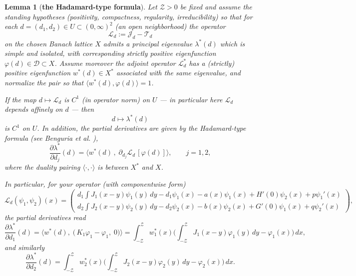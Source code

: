 \documentclass[a4paper,11pt]{amsart}
\newtheorem{lemma}[theorem]{Lemma}
\theoremstyle{definition}
\numberwithin{equation}{section}
\theoremstyle{definition}
\begin{document}
\begin{lemma}[\textbf{the Hadamard-type formula}]\label{lem:lambdaC1}
Let $\mathcal Z>0$ be fixed and assume the standing hypotheses (positivity, compactness, regularity, irreducibility) so that for each
$d=(d_1,d_2)\in U\subset(0,\infty)^2$ (an open neighborhood) the operator
\[
\mathcal L_d := \mathscr J_d - \mathscr T_d
\]
on the chosen Banach lattice \(X\) admits a principal eigenvalue \(\lambda^\ast(d)\) which is simple and isolated, with corresponding strictly positive eigenfunction
\(\varphi(d)\in\mathcal D\subset X\). Assume moreover the adjoint operator \(\mathcal L_d^*\) has a (strictly) positive eigenfunction \(w^*(d)\in X^*\) associated with the same eigenvalue, and normalize the pair so that \(\langle w^*(d),\varphi(d)\rangle =1\).

If the map \(d\mapsto\mathcal L_d\) is \(C^1\) (in operator norm) on \(U\) — in particular here \(\mathcal L_d\) depends affinely on \(d\) — then
\[
d \mapsto \lambda^\ast(d)
\]
is $C^1$ on \(U\). In addition, the partial derivatives are given by the Hadamard-type formula (see Benguria et al. \cite{Benguria2024}),
\[
\frac{\partial \lambda^\ast}{\partial d_j}(d)
= \big\langle w^*(d)\,,\; \partial_{d_j}\mathcal L_d\,[\varphi(d)]\big\rangle,
\qquad j=1,2,
\]
where the duality pairing $\langle\cdot,\cdot\rangle$ is between $X^*$ and $X$.

In particular, for your operator (with componentwise form)
\[
\mathcal L_d(\psi_1,\psi_2)(x)=
\begin{pmatrix}
d_1\!\displaystyle\int J_1(x-y)\psi_1(y)\,dy - d_1\psi_1(x) - a(x)\psi_1(x) + H'(0)\psi_2(x) + p\psi_1'(x)\\[6pt]
d_2\!\displaystyle\int J_2(x-y)\psi_2(y)\,dy - d_2\psi_2(x) - b(x)\psi_2(x) + G'(0)\psi_1(x) + q\psi_2'(x)
\end{pmatrix},
\]
the partial derivatives read
\[
\frac{\partial\lambda^\ast}{\partial d_1}(d)
= \Big\langle w^*(d),\;\big(\,K_1\varphi_1 - \varphi_1,\;0\big)\Big\rangle
= \int_{-\mathcal Z}^{\mathcal Z} w_1^*(x)\Big(\int_{-\mathcal Z}^{\mathcal Z}J_1(x-y)\varphi_1(y)\,dy - \varphi_1(x)\Big)\,dx,
\]
and similarly
\[
\frac{\partial\lambda^\ast}{\partial d_2}(d)
= \int_{-\mathcal Z}^{\mathcal Z} w_2^*(x)\Big(\int_{-\mathcal Z}^{\mathcal Z}J_2(x-y)\varphi_2(y)\,dy - \varphi_2(x)\Big)\,dx.
\]
\end{lemma}
\end{document}
